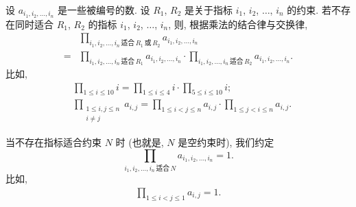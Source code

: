 \documentclass[../libro.tex]{subfiles}
\begin{document}
设 \(a_{i_1, i_2, \dots, i_n}\) 是一些被编号的数.
设 \(R_1\), \(R_2\)
是关于指标 \(i_1\), \(i_2\), \(\dots\), \(i_n\) 的约束.
若不存在同时适合 \(R_1\), \(R_2\)
的指标 \(i_1\), \(i_2\), \(\dots\), \(i_n\),
则, 根据乘法的结合律与交换律,
\begin{equation}
    \begin{aligned}
        &
        \prod_{i_1,i_2,\dots,i_n
        \,\text{适合}\,R_1\,\text{或}\,R_2}
        {a_{i_1, i_2, \dots, i_n}}
        \\
        = {} &
        \prod_{i_1,i_2,\dots,i_n\,\text{适合}\,R_1}
        {a_{i_1, i_2, \dots, i_n}}
        \cdot \prod_{i_1,i_2,\dots,i_n\,\text{适合}\,R_2}
        {a_{i_1, i_2, \dots, i_n}}.
    \end{aligned}
    \label{eq:B0204}
\end{equation}
比如,
\begin{align*}
    & \prod_{1 \leq i \leq 10} {i}
    = \prod_{1 \leq i \leq 4} {i}
    \cdot \prod_{5 \leq i \leq 10} {i};
    \\
    & \prod_{\substack{1 \leq i, j \leq n \\ i \neq j}} {a_{i,j}}
    = \prod_{1 \leq i < j \leq n} {a_{i,j}}
    \cdot \prod_{1 \leq j < i \leq n} {a_{i,j}}.
\end{align*}

当不存在指标适合约束 \(N\) 时
(也就是, \(N\) 是空约束时),
我们约定
\begin{equation}
    \prod_{i_1,i_2,\dots,i_n\,\text{适合}\,N}
    {a_{i_1, i_2, \dots, i_n}} = 1.
    \label{eq:B0205}
\end{equation}
比如,
\begin{align*}
    \prod_{1 \leq i < j \leq 1} {a_{i,j}} = 1.
\end{align*}
\end{document}

